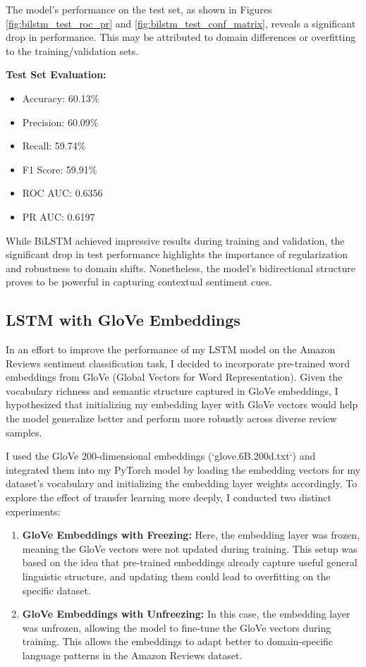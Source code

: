 \documentclass[12pt]{article}
\begin{document}
The model's performance on the test set, as shown in Figures \ref{fig:bilstm_test_roc_pr} and \ref{fig:bilstm_test_conf_matrix}, reveals a significant drop in performance. This may be attributed to domain differences or overfitting to the training/validation sets.

\vspace{1em}
\noindent
\textbf{Test Set Evaluation:}
\begin{itemize}
    \item Accuracy: 60.13\%
    \item Precision: 60.09\%
    \item Recall: 59.74\%
    \item F1 Score: 59.91\%
    \item ROC AUC: 0.6356
    \item PR AUC: 0.6197
\end{itemize}

\vspace{0.5em}
\noindent
While BiLSTM achieved impressive results during training and validation, the significant drop in test performance highlights the importance of regularization and robustness to domain shifts. Nonetheless, the model’s bidirectional structure proves to be powerful in capturing contextual sentiment cues.


\subsection{LSTM with GloVe Embeddings}
\label{subsec:glove}

In an effort to improve the performance of my LSTM model on the Amazon Reviews sentiment classification task, I decided to incorporate pre-trained word embeddings from GloVe (Global Vectors for Word Representation). Given the vocabulary richness and semantic structure captured in GloVe embeddings, I hypothesized that initializing my embedding layer with GloVe vectors would help the model generalize better and perform more robustly across diverse review samples.

I used the GloVe 200-dimensional embeddings (`glove.6B.200d.txt`) and integrated them into my PyTorch model by loading the embedding vectors for my dataset's vocabulary and initializing the embedding layer weights accordingly. To explore the effect of transfer learning more deeply, I conducted two distinct experiments:

\begin{enumerate}
    \item \textbf{GloVe Embeddings with Freezing:} Here, the embedding layer was frozen, meaning the GloVe vectors were not updated during training. This setup was based on the idea that pre-trained embeddings already capture useful general linguistic structure, and updating them could lead to overfitting on the specific dataset.

    \item \textbf{GloVe Embeddings with Unfreezing:} In this case, the embedding layer was unfrozen, allowing the model to fine-tune the GloVe vectors during training. This allows the embeddings to adapt better to domain-specific language patterns in the Amazon Reviews dataset.
\end{enumerate}
\end{document}
